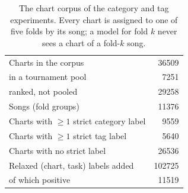 \begin{table}[t]
\centering\small
\caption{The chart corpus of the category and tag experiments. Every chart is assigned to one of five folds by its song; a model for fold $k$ never sees a chart of a fold-$k$ song.}
\label{tab:v2-data}
\begin{tabular}{lr}
\toprule
Charts in the corpus & \num{36509} \\
\quad in a tournament pool & \num{7251} \\
\quad ranked, not pooled & \num{29258} \\
Songs (fold groups) & \num{11376} \\
\midrule
Charts with $\ge1$ strict category label & \num{9559} \\
Charts with $\ge1$ strict tag label & \num{5640} \\
Charts with no strict label & \num{26536} \\
Relaxed (chart, task) labels added & \num{102725} \\
\quad of which positive & \num{11519} \\
\bottomrule
\end{tabular}
\end{table}
